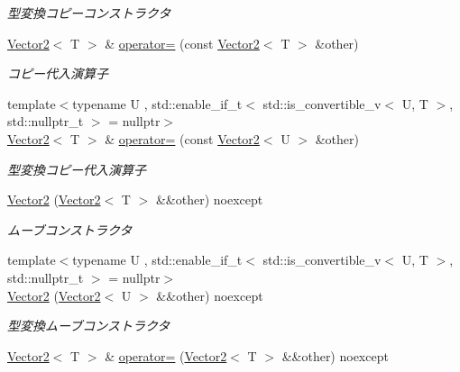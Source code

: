 \begin{DoxyCompactItemize}
\begin{DoxyCompactList}\small\item\em 型変換コピーコンストラクタ \end{DoxyCompactList}\item 
\mbox{\hyperlink{classsaki_1_1_vector2}{Vector2}}$<$ T $>$ \& \mbox{\hyperlink{classsaki_1_1_vector2_a69d8d8afcbdd1a1ae8d290665ec187da}{operator=}} (const \mbox{\hyperlink{classsaki_1_1_vector2}{Vector2}}$<$ T $>$ \&other)
\begin{DoxyCompactList}\small\item\em コピー代入演算子 \end{DoxyCompactList}\item 
{\footnotesize template$<$typename U , std\+::enable\+\_\+if\+\_\+t$<$ std\+::is\+\_\+convertible\+\_\+v$<$ U, T $>$, std\+::nullptr\+\_\+t $>$  = nullptr$>$ }\\\mbox{\hyperlink{classsaki_1_1_vector2}{Vector2}}$<$ T $>$ \& \mbox{\hyperlink{classsaki_1_1_vector2_aff69a4dc858a6a8b3d598db350d59dd0}{operator=}} (const \mbox{\hyperlink{classsaki_1_1_vector2}{Vector2}}$<$ U $>$ \&other)
\begin{DoxyCompactList}\small\item\em 型変換コピー代入演算子 \end{DoxyCompactList}\item 
\mbox{\hyperlink{classsaki_1_1_vector2_a770b0d8588ea98ac88a35ba46657cc6d}{Vector2}} (\mbox{\hyperlink{classsaki_1_1_vector2}{Vector2}}$<$ T $>$ \&\&other) noexcept
\begin{DoxyCompactList}\small\item\em ムーブコンストラクタ \end{DoxyCompactList}\item 
{\footnotesize template$<$typename U , std\+::enable\+\_\+if\+\_\+t$<$ std\+::is\+\_\+convertible\+\_\+v$<$ U, T $>$, std\+::nullptr\+\_\+t $>$  = nullptr$>$ }\\\mbox{\hyperlink{classsaki_1_1_vector2_ab2677ccc77f16ad41792ccc158f22fa6}{Vector2}} (\mbox{\hyperlink{classsaki_1_1_vector2}{Vector2}}$<$ U $>$ \&\&other) noexcept
\begin{DoxyCompactList}\small\item\em 型変換ムーブコンストラクタ \end{DoxyCompactList}\item 
\mbox{\hyperlink{classsaki_1_1_vector2}{Vector2}}$<$ T $>$ \& \mbox{\hyperlink{classsaki_1_1_vector2_a453d91aee14283e657be81258d62a6d9}{operator=}} (\mbox{\hyperlink{classsaki_1_1_vector2}{Vector2}}$<$ T $>$ \&\&other) noexcept

\end{DoxyCompactItemize}

